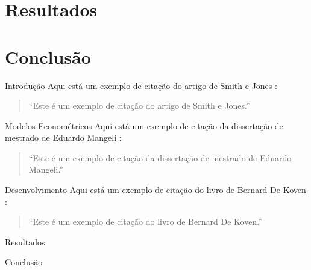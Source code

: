 \documentclass[9pt, aspectratio=169]{beamer}
\begin{document}
	\section{Resultados}
	
	\section{Conclusão}
	
	
	\begin{frame}{Introduç\~{a}o}
		Aqui está um exemplo de citação do artigo de Smith e Jones \cite{Author1Title}:
		\begin{quote}
			``Este é um exemplo de citação do artigo de Smith e Jones.''
		\end{quote}
	\end{frame}
	
	\begin{frame}{Modelos Econométricos}
		Aqui está um exemplo de citação da dissertação de mestrado de Eduardo Mangeli \cite{Mangeli2016}:
		\begin{quote}
			``Este é um exemplo de citação da dissertação de mestrado de Eduardo Mangeli.''
		\end{quote}
	\end{frame}
	
	\begin{frame}{Desenvolvimento}
		Aqui está um exemplo de citação do livro de Bernard De Koven \cite{DeKoven2013}:
		\begin{quote}
			``Este é um exemplo de citação do livro de Bernard De Koven.''
		\end{quote}
	\end{frame}
	
	
	\begin{frame}{Resultados}
	\end{frame}
	
	\begin{frame}{Conclus\~{a}o}
	\end{frame}
	
\end{document}
